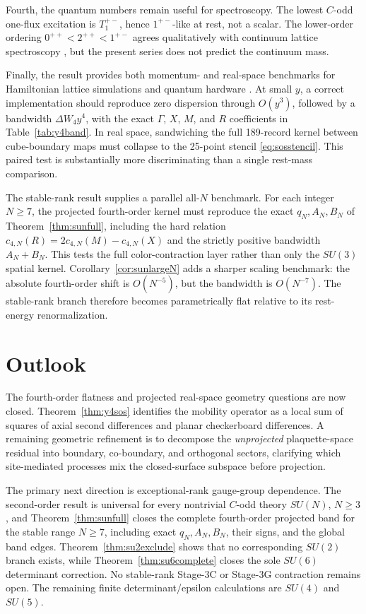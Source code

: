 \documentclass[11pt]{article}
\begin{document}
Fourth, the quantum numbers remain useful for spectroscopy. The lowest
$C$-odd one-flux excitation is $T_1^{+-}$, hence $1^{+-}$-like at rest, not
a scalar. The lower-order ordering $0^{++}<2^{++}<1^{+-}$ agrees
qualitatively with continuum lattice spectroscopy
\cite{MorningstarPeardon1999,AthenodorouTeper2020}, but the present series
does not predict the continuum mass.

Finally, the result provides both momentum- and real-space benchmarks for
Hamiltonian lattice simulations and quantum hardware \cite{Baueretal2023}.
At small $y$, a correct implementation should reproduce zero dispersion
through $O(y^3)$, followed by a bandwidth $\Delta W_4y^4$, with the exact
$\Gamma$, $X$, $M$, and $R$ coefficients in Table~\ref{tab:y4band}. In real
space, sandwiching the full 189-record kernel between cube-boundary maps must
collapse to the 25-point stencil \eqref{eq:sosstencil}. This paired test is
substantially more discriminating than a single rest-mass comparison.

The stable-rank result supplies a parallel all-$N$ benchmark. For each integer
$N\geq7$, the projected fourth-order kernel must reproduce the exact
$q_N,A_N,B_N$ of Theorem~\ref{thm:sunfull}, including the hard relation
$c_{4,N}(R)=2c_{4,N}(M)-c_{4,N}(X)$ and the strictly positive bandwidth
$A_N+B_N$. This tests the full color-contraction layer rather than only the
$SU(3)$ spatial kernel. Corollary~\ref{cor:sunlargeN} adds a sharper scaling
benchmark: the absolute fourth-order shift is $O(N^{-5})$, but the bandwidth
is $O(N^{-7})$. The stable-rank branch therefore becomes parametrically flat
relative to its rest-energy renormalization.

\section{Outlook}
\label{sec:outlook}

The fourth-order flatness and projected real-space geometry questions are now
closed. Theorem~\ref{thm:y4sos} identifies the mobility operator as a local
sum of squares of axial second differences and planar checkerboard
differences. A remaining geometric refinement is to decompose the
\emph{unprojected} plaquette-space residual into boundary, co-boundary, and
orthogonal sectors, clarifying which site-mediated processes mix the
closed-surface subspace before projection.

The primary next direction is exceptional-rank gauge-group dependence. The
second-order result is universal for every nontrivial $C$-odd theory
$SU(N)$, $N\geq3$, and Theorem~\ref{thm:sunfull} closes the complete
fourth-order projected band for the stable range $N\geq7$, including exact
$q_N,A_N,B_N$, their signs, and the global band edges. Theorem~\ref{thm:su2exclude}
shows that no corresponding $SU(2)$ branch exists, while
Theorem~\ref{thm:su6complete} closes the sole $SU(6)$ determinant correction.
No stable-rank Stage-3C or Stage-3G contraction remains open. The remaining
finite determinant/epsilon calculations are $SU(4)$ and $SU(5)$.
\end{document}
